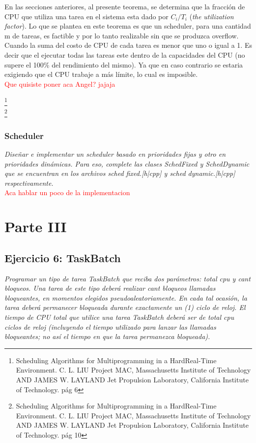 \documentclass[a4paper]{article}
\begin{document}
En las secciones anteriores, al presente teorema, se determina que la fracción de CPU que utiliza una tarea en el sistema esta dado por $C_i/T_i$ (\textit{the utilization factor}). Lo que se plantea en este teorema es que un scheduler, para una cantidad m de tareas, es factible y por lo tanto realizable sin que se produzca overflow. Cuando la suma del costo de CPU de cada tarea es menor que uno o igual a 1. Es decir que el ejecutar todas las tareas este dentro de la capacidades del CPU (no supere el 100\% del rendimiento del mismo). Ya que en caso contrario se estaria exigiendo que el CPU trabaje a más límite, lo cual es imposible. \\


\textcolor{red}{Que quisiste poner aca Angel? jajaja}

\footnote[1]{Scheduling Algorithms for Multiprogramming in a HardReal-Time Environment.
C. L. LIU Project MAC, Massachusetts Institute of Technology AND JAMES W. LAYLAND Jet Propulsion Laboratory, California Institute of Technology. pág 6}\\
\footnote[2]{Scheduling Algorithms for Multiprogramming in a HardReal-Time Environment.
C. L. LIU Project MAC, Massachusetts Institute of Technology AND JAMES W. LAYLAND Jet Propulsion Laboratory, California Institute of Technology. pág 10}




\subsubsection{Scheduler}
\textit{Dise\~nar e implementar un scheduler basado en prioridades fijas y otro en prioridades din\'amicas. Para eso, complete las clases SchedFixed y SchedDynamic que se encuentran en los archivos sched fixed.[h|cpp] y sched dynamic.[h|cpp] respectivamente.}\\

\textcolor{red}{Aca hablar un poco de la implementacion}





\newpage
\section{Parte III}


 \subsection{Ejercicio 6: TaskBatch}
\textit{Programar un tipo de tarea TaskBatch que reciba dos par\'ametros: total cpu y cant bloqueos. Una tarea de este tipo deber\'a realizar cant bloqueos llamadas bloqueantes, en momentos elegidos pseudoaleatoriamente. En cada tal ocasi\'on, la tarea deber\'a permanecer bloqueada durante exactamente un (1) ciclo de reloj. El tiempo de CPU total que utilice una tarea TaskBatch deber\'a ser de total cpu ciclos de reloj (incluyendo el tiempo utilizado para lanzar las llamadas bloqueantes; no as\'i el tiempo en que la tarea permanezca bloqueada).}
\end{document}
